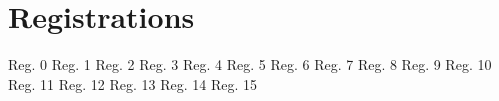 \section{Registrations}
Reg. 0
Reg. 1
Reg. 2
Reg. 3
Reg. 4
Reg. 5
Reg. 6
Reg. 7
Reg. 8
Reg. 9
Reg. 10
Reg. 11
Reg. 12
Reg. 13
Reg. 14
Reg. 15
